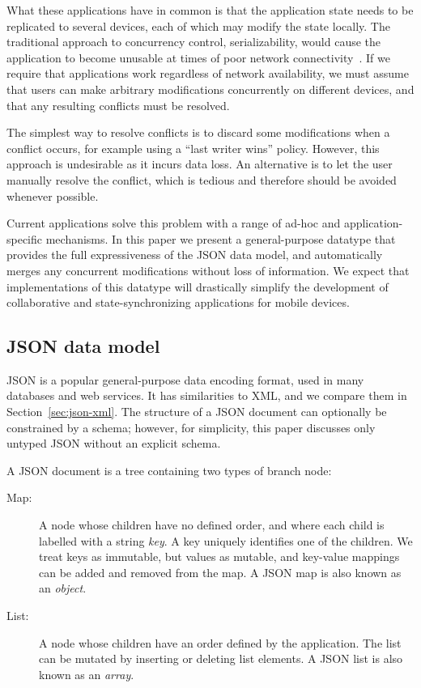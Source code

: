 \documentclass[10pt,journal,compsoc]{IEEEtran}
\begin{document}
What these applications have in common is that the application state needs to be replicated to several devices, each of which may modify the state locally. The traditional approach to concurrency control, serializability, would cause the application to become unusable at times of poor network connectivity~\cite{Davidson:1985hv}. If we require that applications work regardless of network availability, we must assume that users can make arbitrary modifications concurrently on different devices, and that any resulting conflicts must be resolved.

The simplest way to resolve conflicts is to discard some modifications when a conflict occurs, for example using a ``last writer wins'' policy. However, this approach is undesirable as it incurs data loss. An alternative is to let the user manually resolve the conflict, which is tedious and therefore should be avoided whenever possible.

Current applications solve this problem with a range of ad-hoc and application-specific mechanisms. In this paper we present a general-purpose datatype that provides the full expressiveness of the JSON data model, and automatically merges any concurrent modifications without loss of information. We expect that implementations of this datatype will drastically simplify the development of collaborative and state-synchronizing applications for mobile devices.

\subsection{JSON data model}

JSON is a popular general-purpose data encoding format, used in many databases and web services. It has similarities to XML, and we compare them in Section~\ref{sec:json-xml}. The structure of a JSON document can optionally be constrained by a schema; however, for simplicity, this paper discusses only untyped JSON without an explicit schema.

A JSON document is a tree containing two types of branch node:

\begin{description}
\item[Map:] A node whose children have no defined order, and where each child is labelled with a string \emph{key}. A key uniquely identifies one of the children. We treat keys as immutable, but values as mutable, and key-value mappings can be added and removed from the map. A JSON map is also known as an \emph{object}.
\item[List:] A node whose children have an order defined by the application. The list can be mutated by inserting or deleting list elements. A JSON list is also known as an \emph{array}.
\end{description}
\end{document}
